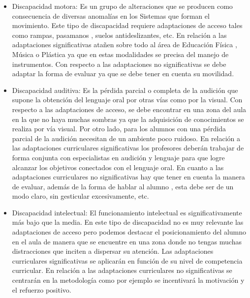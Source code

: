 \begin{itemize}
    \item Discapacidad motora: Es un grupo de alteraciones que se producen como consecuencia de diversas anomalías en los Sistemas que forman el movimiento. Este tipo de discapacidad requiere  adaptaciones de acceso tales como rampas, pasamanos , suelos antideslizantes, etc. 
    En relación a las adaptaciones significativas atañen sobre todo al área de Educación Física , Música o Plástica ya que en estas modalidades se precisa del manejo de instrumentos. 
    Con respecto a las adaptaciones no significativas se debe adaptar la forma de evaluar ya que se debe tener en cuenta su movilidad. 
    
    \item Discapacidad auditiva: Es la pérdida parcial o completa de la audición que supone la obtención del lenguaje oral por otras vías como por la visual. Con respecto a las adaptaciones de acceso,  se debe encontrar en una zona del aula en la que no haya muchas sombras ya que la adquisición de conocimientos se realiza por vía visual. Por otro lado, para los alumnos con una pérdida parcial de la audición necesitan de un ambiente poco ruidoso. 
    En relación a las adaptaciones curriculares significativas los profesores deberán trabajar de forma conjunta con especialistas en audición y lenguaje para que logre alcanzar los objetivos conectados con el lenguaje oral.
    En cuanto a las adaptaciones curriculares no significativas hay que tener en cuenta la manera de evaluar, además de la forma de hablar al alumno , esta debe ser de un modo claro, sin gesticular excesivamente, etc.
    
    \item Discapacidad intelectual: El funcionamiento intelectual es significativamente más bajo que la media. En este tipo de discapacidad no es muy relevante las adaptaciones de acceso pero podemos destacar el posicionamiento del alumno en el aula de manera que se encuentre en una zona donde no tengas muchas distracciones  que inciten a dispersar su atención.
    Las adaptaciones curriculares significativas se aplicarán en función de su nivel de competencia curricular. 
    En relación a las adaptaciones curriculares no significativas se centrarán en la metodología como por ejemplo  se incentivará la motivación y el refuerzo positivo.
    

\end{itemize}
